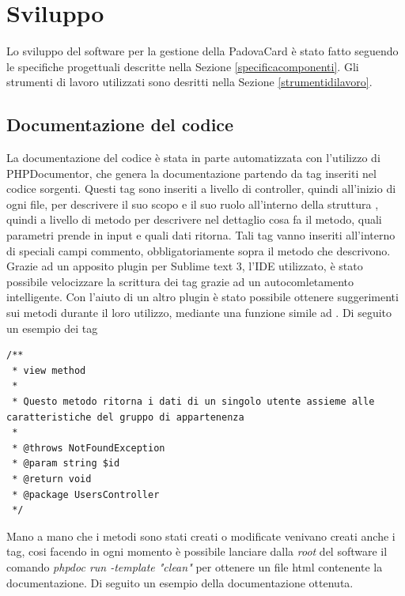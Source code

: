 \clearpage\null\newpage
\section{Sviluppo}
Lo sviluppo del software per la gestione della PadovaCard è stato fatto seguendo le specifiche progettuali descritte nella Sezione \ref{specificacomponenti}.
Gli strumenti di lavoro utilizzati sono desritti nella Sezione \ref{strumentidilavoro}.
\subsection{Documentazione del codice}
La documentazione del codice è stata in parte automatizzata con l'utilizzo di PHPDocumentor, che genera la documentazione partendo da tag inseriti nel codice sorgenti.
Questi tag sono inseriti a livello di controller, quindi all'inizio di ogni file, per descrivere il suo scopo e il suo ruolo all'interno della struttura , quindi a livello di metodo per descrivere nel dettaglio cosa fa il metodo, quali parametri prende in input e quali dati ritorna.
Tali tag vanno inseriti all'interno di speciali campi commento, obbligatoriamente sopra il metodo che descrivono. \\

Grazie ad un apposito plugin per Sublime text 3, l'IDE utilizzato, è stato possibile velocizzare la scrittura dei tag grazie ad un autocomletamento intelligente. Con l'aiuto di un altro plugin è stato possibile ottenere suggerimenti sui metodi durante il loro utilizzo, mediante una funzione simile ad .
Di seguito un esempio dei tag 
\lstset{frame=single}
\begin{center}
\begin{lstlisting}
/**
 * view method
 *
 * Questo metodo ritorna i dati di un singolo utente assieme alle caratteristiche del gruppo di appartenenza
 *
 * @throws NotFoundException
 * @param string $id
 * @return void
 * @package UsersController
 */
\end{lstlisting}
\end{center}
Mano a mano che i metodi sono stati creati o modificate venivano creati anche i tag, cosi facendo in ogni momento è possibile lanciare dalla \textit{root} del software il comando
\textit{phpdoc run -template "clean"} per ottenere un file html contenente la documentazione.
Di seguito un esempio della documentazione ottenuta.

